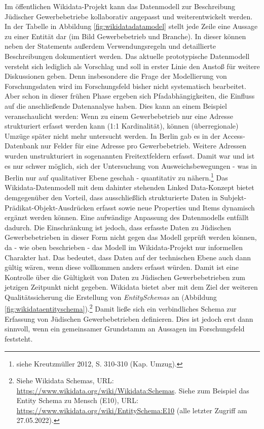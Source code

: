 Im öffentlichen Wikidata-Projekt kann das Datenmodell zur Beschreibung Jüdischer Gewerbebetriebe kollaborativ angepasst und weiterentwickelt werden. In der Tabelle in Abbildung \ref{fig:wikidatadatamodel} stellt jede Zeile eine Aussage zu einer Entität dar (im Bild Gewerbebetrieb und Branche). In dieser können neben der Statements außerdem Verwendungsregeln und detaillierte Beschreibungen dokumentiert werden. Das aktuelle prototypische Datenmodell versteht sich lediglich als Vorschlag und soll in erster Linie den Anstoß für weitere Diskussionen geben. Denn insbesondere die Frage der Modellierung von Forschungsdaten wird im Forschungsfeld bisher nicht systematisch bearbeitet. Aber schon in dieser frühen Phase ergeben sich Pfadabhängigkeiten, die Einfluss auf die anschließende Datenanalyse haben. Dies kann an einem Beispiel veranschaulicht werden: Wenn zu einem Gewerbebetrieb nur eine Adresse strukturiert erfasst werden kann (1:1 Kardinalität), können (überregionale) Umzüge später nicht mehr untersucht werden. In Berlin gab es in der Access-Datenbank nur Felder für eine Adresse pro Gewerbebetrieb. Weitere Adressen wurden unstrukturiert in sogenannten Freitextfeldern erfasst. Damit war und ist es nur schwer möglich, sich der Untersuchung von Ausweichsbewegungen - was in Berlin nur auf qualitativer Ebene geschah - quantitativ zu nähern.\footnote{siehe Kreutzmüller 2012, S. 310-310 (Kap. Umzug).} Das Wikidata-Datenmodell mit dem dahinter stehenden Linked Data-Konzept bietet demgegenüber den Vorteil, dass ausschließlich strukturierte Daten in Subjekt-Prädikat-Objekt-Ausdrücken erfasst sowie neue Properties und Items dynamisch ergänzt werden können. Eine aufwändige Anpassung des Datenmodells entfällt dadurch. Die Einschränkung ist jedoch, dass erfasste Daten zu Jüdischen Gewerbebetrieben in dieser Form nicht gegen das Modell geprüft werden können, da - wie oben beschrieben - das Modell im Wikidata-Projekt nur informellen Charakter hat. Das bedeutet, dass Daten auf der technischen Ebene auch dann gültig wären, wenn diese vollkommen anders erfasst würden. Damit ist eine Kontrolle über die Gültigkeit von Daten zu Jüdischen Gewerbebetrieben zum jetzigen Zeitpunkt nicht gegeben. Wikidata bietet aber mit dem Ziel der weiteren Qualitätssicherung die Erstellung von \textit{EntitySchemas} an (Abbildung \ref{fig:wikidataentityschema}).\footnote{Siehe Wikidata Schemas, URL: \url{https://www.wikidata.org/wiki/Wikidata:Schemas}. Siehe zum Beispiel das Entity Schema zu Mensch (E10), URL: \url{https://www.wikidata.org/wiki/EntitySchema:E10} (alle letzter Zugriff am 27.05.2022).} Damit ließe sich ein verbindliches Schema zur Erfassung von Jüdischen Gewerbebetrieben definieren. Dies ist jedoch erst dann sinnvoll, wenn ein gemeinsamer Grundstamm an Aussagen im Forschungsfeld feststeht.

